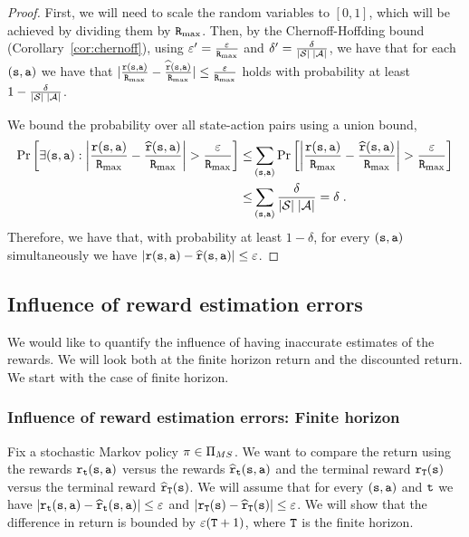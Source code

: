\begin{proof}
First, we will need to scale the random variables to $[0,1]$, which
will be achieved by dividing them by ${\tt R}_{\max }$. Then, by the
Chernoff-Hoffding bound (Corollary~\ref{cor:chernoff}), using
$\varepsilon'= \frac{\varepsilon}{{\tt R}_{\max }}$ and $\delta'=
\frac{\delta}{|\mathcal{S}|\;|\mathcal{A}|}$, we have that for each
$({\tt s},{\tt a})$ we have that 
$|\frac{{\tt r}({\tt s},{\tt a})}{{\tt R}_{\max }}-\frac{\widehat{{\tt r}}({\tt s},{\tt a})}{{\tt R}_{\max }}|\leq
\frac{\varepsilon}{{\tt R}_{\max }}$ holds
with probability at least
$1-\frac{\delta}{|\mathcal{S}|\;|\mathcal{A}|}$.

We bound the probability over all state-action pairs using a union
bound,
\begin{align*}
\Pr\left[\exists ({\tt s},{\tt a}):
\left|\frac{{\tt r}({\tt s},{\tt a})}{{\tt R}_{\max }}-\frac{\widehat{{\tt r}}({\tt s},{\tt a})}{{\tt R}_{\max }}\right|
> \frac{\varepsilon}{{\tt R}_{\max }}\right] \leq &
\sum_{({\tt s},{\tt a})} \Pr\left[
\left|\frac{{\tt r}({\tt s},{\tt a})}{{\tt R}_{\max }}-\frac{\widehat{{\tt r}}({\tt s},{\tt a})}{{\tt R}_{\max }}\right|
> \frac{\varepsilon}{{\tt R}_{\max }}\right] \\
\leq & \sum_{({\tt s},{\tt a})}
\frac{\delta}{|\mathcal{S}|\;|\mathcal{A}|}=\delta\;.
\end{align*}
 Therefore,
we have that, with probability at least $1-\delta$, for every
$({\tt s},{\tt a})$ simultaneously we have
$|{\tt r}({\tt s},{\tt a})-\widehat{{\tt r}}({\tt s},{\tt a})|\leq
\varepsilon$.
\end{proof}

\subsection{Influence of reward estimation errors}

We would like to quantify the influence of having inaccurate
estimates of the rewards. We will look both at the finite horizon
return and the discounted return. We start with the case of finite
horizon.

\subsubsection{Influence of reward estimation errors: Finite horizon}

Fix a stochastic Markov policy $\pi\in  {\Pi _{MS}}$. We want
to compare the return using the rewards ${\tt r}_{\tt t}({\tt s},{\tt a})$ versus the rewards
$\widehat{{\tt r}}_{\tt t}({\tt s},{\tt a})$ and the terminal reward ${\tt r}_{\tt T}({\tt s})$
versus the terminal reward $\widehat{{\tt r}}_{\tt T}({\tt s})$. We will assume that
for every $({\tt s},{\tt a})$ and ${\tt t}$ we have
$|{\tt r}_{\tt t}({\tt s},{\tt a})-\widehat{{\tt r}}_{\tt t}({\tt s},{\tt a})|\leq
\varepsilon$ and
$|{\tt r}_{\tt T}({\tt s})-\widehat{{\tt r}}_{\tt T}({\tt s})|\leq
\varepsilon$. We will show that the difference in return is bounded
by $\varepsilon({\tt T}+1)$, where ${\tt T}$ is the finite
horizon.

